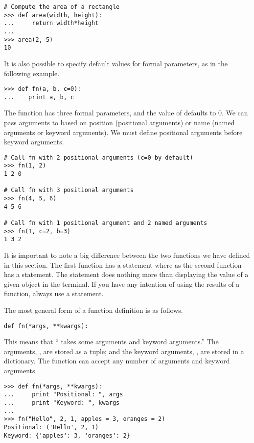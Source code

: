 \begin{lstlisting}
# Compute the area of a rectangle
>>> def area(width, height):
...     return width*height
...         
>>> area(2, 5)
10
\end{lstlisting}

It is also possible to specify default values for formal parameters, as in the following example.
\begin{lstlisting}
>>> def fn(a, b, c=0):
...    print a, b, c
\end{lstlisting}
The function  has three formal parameters, and the value of  defaults to 0.
We can pass arguments to  based on position (positional arguments) or name (named arguments or keyword arguments). We must define positional arguments before keyword arguments.
\begin{lstlisting}
# Call fn with 2 positional arguments (c=0 by default)
>>> fn(1, 2)
1 2 0

# Call fn with 3 positional arguments
>>> fn(4, 5, 6)
4 5 6

# Call fn with 1 positional argument and 2 named arguments
>>> fn(1, c=2, b=3)
1 3 2
\end{lstlisting}


It is important to note a big difference between the two functions we have defined in this section.  The first function has a  statement where as the second function has a  statement.  The  statement does nothing more than displaying the value of a given object in the terminal.  If you have any intention of using the results of a function, always use a  statement.

The most general form of a function definition is as follows.
\begin{lstlisting}
def fn(*args, **kwargs):
\end{lstlisting}
This means that `` takes some arguments and keyword arguments.''
The arguments, , are stored as a tuple; and the keyword arguments, , are stored in a dictionary.
The function  can accept any number of arguments and keyword arguments.
\begin{lstlisting}
>>> def fn(*args, **kwargs):
...     print "Positional: ", args
...     print "Keyword: ", kwargs
...     
>>> fn("Hello", 2, 1, apples = 3, oranges = 2)
Positional: ('Hello', 2, 1)
Keyword: {'apples': 3, 'oranges': 2}
\end{lstlisting}

